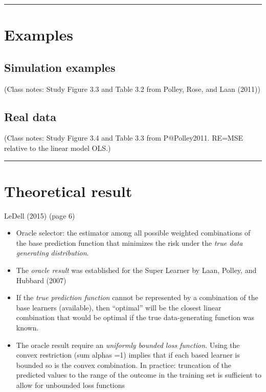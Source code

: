 \documentclass[
  letterpaper,
  DIV=11,
  numbers=noendperiod]{scrartcl}
\begin{document}
\begin{center}\rule{0.5\linewidth}{0.5pt}\end{center}

\hypertarget{examples}{%
\section{Examples}\label{examples}}

\hypertarget{simulation-examples}{%
\subsection{Simulation examples}\label{simulation-examples}}

(Class notes: Study Figure 3.3 and Table 3.2 from Polley, Rose, and Laan
(2011))

\hypertarget{real-data}{%
\subsection{Real data}\label{real-data}}

(Class notes: Study Figure 3.4 and Table 3.3 from P@Polley2011. RE=MSE
relative to the linear model OLS.)

\begin{center}\rule{0.5\linewidth}{0.5pt}\end{center}

\hypertarget{theoretical-result}{%
\section{Theoretical result}\label{theoretical-result}}

LeDell (2015) (page 6)

\begin{itemize}
\item
  Oracle selector: the estimator among all possible weighted
  combinations of the base prediction function that minimizes the risk
  under the \emph{true data generating distribution}.
\item
  The \emph{oracle result} was established for the Super Learner by
  Laan, Polley, and Hubbard (2007)
\item
  If the \emph{true prediction function} cannot be represented by a
  combination of the base learners (available), then ``optimal'' will be
  the closest linear combination that would be optimal if the true
  data-generating function was known.
\item
  The oracle result require an \emph{uniformly bounded loss function}.
  Using the convex restriction (sum alphas =1) implies that if each
  based learner is bounded so is the convex combination. In practice:
  truncation of the predicted values to the range of the outcome in the
  training set is sufficient to allow for unbounded loss functions
\end{itemize}
\end{document}
